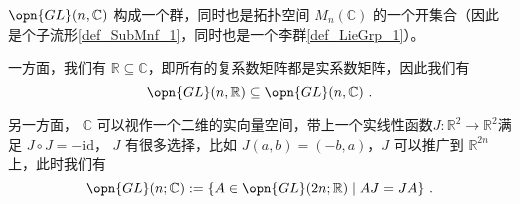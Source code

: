 $\opn{GL}(n, \mathbb{C})$ 构成一个群，同时也是拓扑空间 $M_n(\mathbb{C})$ 的一个开集合（因此是个子流形\autoref{def_SubMnf_1}，同时也是一个李群\autoref{def_LieGrp_1}）。

一方面，我们有 $\mathbb{R} \subseteq \mathbb{C}$，即所有的复系数矩阵都是实系数矩阵，因此我们有
$$
\opn{GL}(n, \mathbb{R}) \subseteq \opn{GL}(n, \mathbb{C})~.
$$

另一方面， $\mathbb{C}$ 可以视作一个二维的实向量空间，带上一个实线性函数$J: \mathbb{R}^2 \to \mathbb{R}^2$满足 $J \circ J = -\text{id}$， $J$ 有很多选择，比如 $J(a, b) = (-b, a)$，$J$ 可以推广到 $\mathbb{R}^{2 n}$ 上，此时我们有
$$
\opn{GL}(n; \mathbb{C}): = \{A \in \opn{GL}(2 n; \mathbb{R}) \mid A J = J A \}~.
$$






